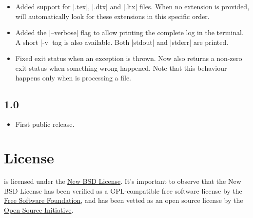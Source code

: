 \documentclass[a4paper,twoside,12pt]{memoir}
\begin{document}
\begin{itemize}
\item[\featurenew] Added support for |.tex|, |.dtx| and |.ltx| files. When no extension is provided, \arara will automatically look for these extensions in this specific order.
\item[\featurenew] Added the |--verbose| flag to allow printing the complete log in the terminal. A short |-v| tag is also available. Both |stdout| and |stderr| are printed.
\item[\featurefixed] Fixed exit status when an exception is thrown. Now \arara also returns a non-zero exit status when something wrong happened. Note that this behaviour happens only when \arara is processing a file.
\end{itemize}

\subsection*{1.0}

\begin{itemize}
\item[\featurenew] First public release.
\end{itemize}



\cleardoublepage

\section*{License}

\arara is licensed under the 
\href{http://www.opensource.org/licenses/bsd-license.php}{New BSD License}. 
It's important to observe that the New BSD License has been verified as a 
GPL-compatible free software license by the
\href{http://www.fsf.org/}{Free Software Foundation}, and has been vetted as an 
open source license by the 
\href{http://www.opensource.org/}{Open Source Initiative}.

\vfill
\end{document}
